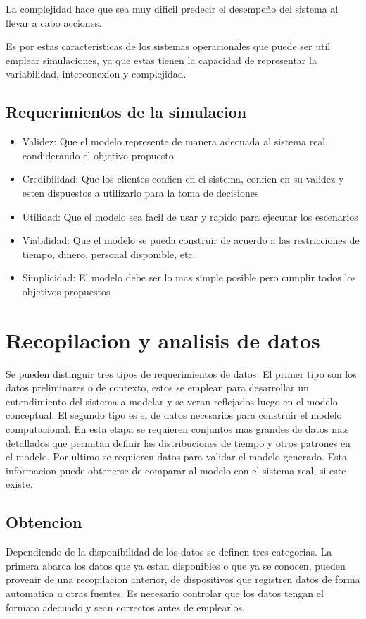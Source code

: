 \documentclass[a4paper]{article}
\begin{document}
La complejidad hace que sea muy dificil predecir el desempeño del sistema
al llevar a cabo acciones.

Es por estas caracteristicas de los sistemas operacionales que puede ser
util emplear simulaciones, ya que estas tienen la capacidad de representar
la variabilidad, interconexion y complejidad.

\subsection*{Requerimientos de la simulacion}
\begin{itemize}
    \item Validez: Que el modelo represente de manera adecuada al sistema real,
    condiderando el objetivo propuesto
    \item Credibilidad: Que los clientes confien en el sistema, confien en su 
    validez y esten dispuestos a utilizarlo para la toma de decisiones
    \item Utilidad: Que el modelo sea facil de usar y rapido para ejecutar los 
    escenarios
    \item Viabilidad: Que el modelo se pueda construir de acuerdo a las restricciones
    de tiempo, dinero, personal disponible, etc.
    \item Simplicidad: El modelo debe ser lo mas simple posible pero cumplir todos los 
    objetivos propuestos
\end{itemize}


\section*{Recopilacion y analisis de datos}
Se pueden distinguir tres tipos de requerimientos de datos. El primer tipo son 
los datos preliminares o de contexto, estos se emplean para desarrollar un 
entendimiento del sistema a modelar y se veran reflejados luego en el modelo 
conceptual.
El segundo tipo es el de datos necesarios para construir el modelo computacional.
En esta etapa se requieren conjuntos mas grandes de datos mas detallados que 
permitan definir las distribuciones de tiempo y otros patrones en el modelo.
Por ultimo se requieren datos para validar el modelo generado.
Esta informacion puede obtenerse de comparar al modelo con el sistema real,
si este existe.

\subsection*{Obtencion}
Dependiendo de la disponibilidad de los datos se definen tres categorias.
La primera abarca los datos que ya estan disponibles o que ya se conocen, 
pueden provenir de una recopilacion anterior, de dispositivos que registren
datos de forma automatica u otras fuentes. Es necesario controlar que 
los datos tengan el formato adecuado y sean correctos antes de emplearlos.
\end{document}
